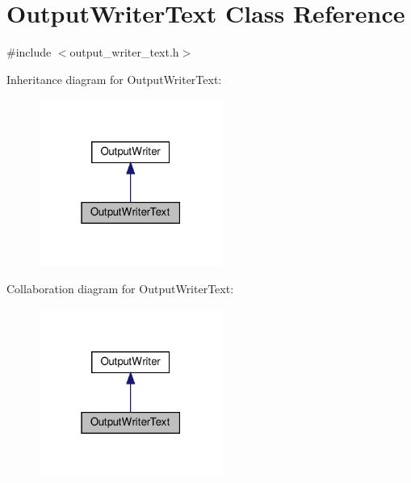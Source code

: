 \hypertarget{classOutputWriterText}{}\section{Output\+Writer\+Text Class Reference}
\label{classOutputWriterText}


{\ttfamily \#include $<$output\+\_\+writer\+\_\+text.\+h$>$}



Inheritance diagram for Output\+Writer\+Text\+:\nopagebreak
\begin{figure}[H]
\begin{center}
\leavevmode
\includegraphics[width=171pt]{classOutputWriterText__inherit__graph}
\end{center}
\end{figure}


Collaboration diagram for Output\+Writer\+Text\+:\nopagebreak
\begin{figure}[H]
\begin{center}
\leavevmode
\includegraphics[width=171pt]{classOutputWriterText__coll__graph}
\end{center}
\end{figure}
